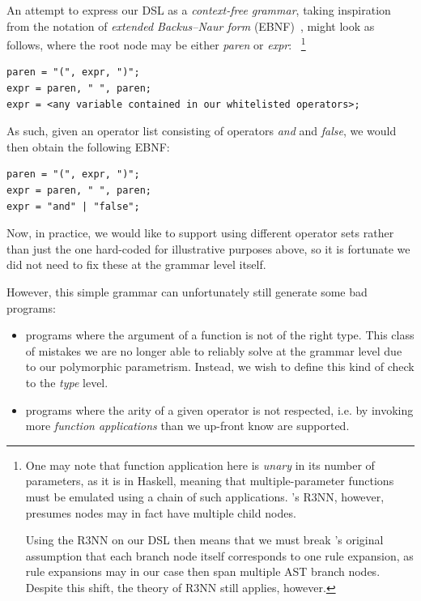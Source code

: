 \documentclass{article}
\begin{document}
An attempt to express our DSL
as a \emph{context-free grammar},
taking inspiration from the notation of \emph{extended Backus–Naur form} (EBNF)~\citep{standard1996ebnf},
might look as follows,
where the root node may be either \emph{paren} or \emph{expr}:%
~\footnote{
    One may note that function application here is \emph{unary} in its number of parameters, as it is in Haskell,
    meaning that multiple-parameter functions must be emulated using a chain of such applications.
    \citet{nsps}'s R3NN, however, presumes nodes may in fact have multiple child nodes.

    Using the R3NN on our DSL then means that we must break \citet{nsps}'s original
    assumption that each branch node itself corresponds to one rule expansion,
    as rule expansions may in our case then span multiple AST branch nodes.
    Despite this shift, the theory of R3NN still applies, however.
}

\begin{verbatim}
paren = "(", expr, ")";
expr = paren, " ", paren;
expr = <any variable contained in our whitelisted operators>;
\end{verbatim}

As such, given an operator list consisting of operators \emph{and} and \emph{false},
we would then obtain the following EBNF:

\begin{verbatim}
paren = "(", expr, ")";
expr = paren, " ", paren;
expr = "and" | "false";
\end{verbatim}

Now, in practice, we would like to support using different operator sets
rather than just the one hard-coded for illustrative purposes above,
so it is fortunate we did not need to fix these at the grammar level itself.

However, this simple grammar can unfortunately still generate some bad programs:
\begin{itemize}
    \item programs where the argument of a function is not of the right type.
        This class of mistakes we are no longer able to reliably solve
        at the grammar level due to our polymorphic parametrism.
        Instead, we wish to define this kind of check to the \emph{type} level.
    \item programs where the arity of a given operator is not respected, i.e.
        by invoking more \emph{function applications} than we up-front know are supported.
\end{itemize}
\end{document}
